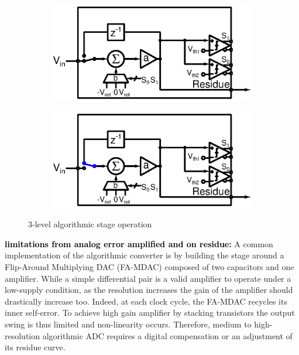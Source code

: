 \begin{figure}[htp]
	\centering
	\begin{subfigure}[b]{0.48\textwidth}
		\centering
		\includegraphics[width=\textwidth]{Chapter4/Figs/algorithmic-principle-new_sample.ps}
		\label{fig:algo-alone-reset-clk-cycle}
	\end{subfigure}
	\begin{subfigure}[b]{0.48\textwidth}
		\centering
		\includegraphics[width=\textwidth]{Chapter4/Figs/algorithmic-principle.ps}
		\label{fig:algo-alone-std-clk-cycle}
	\end{subfigure}
	\caption{3-level algorithmic stage operation}
	\label{fig:algo-alone-clk-cycle}
\end{figure}

\textbf{\textcolor{black}{limitations from analog error amplified and on residue:}}
A common implementation of the algorithmic converter is by building the stage around a Flip-Around Multiplying DAC (FA-MDAC) composed of two capacitors and one amplifier. While a simple differential pair is a valid amplifier to operate under a low-supply condition, as the resolution increases the gain of the amplifier should drastically increase too. Indeed, at each clock cycle, the FA-MDAC recycles its inner self-error. To achieve high gain amplifier by stacking transistors the output swing is thus limited and non-linearity occurs. Therefore, medium to high-resolution algorithmic ADC requires a digital compensation or an adjustment of its residue curve.

